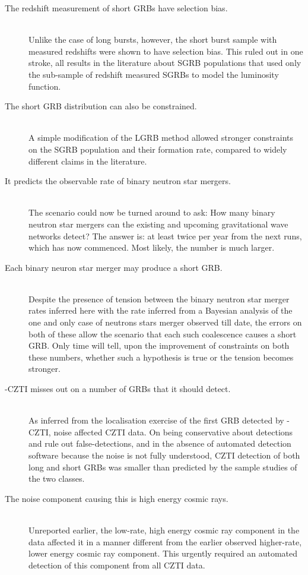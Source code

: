 \begin{description}
\item[The redshift measurement of short GRBs have selection bias.] \hfill \\
Unlike the case of long bursts, however, the short burst sample with measured redshifts were shown to have selection bias. This ruled out in one stroke, all results in the literature about SGRB populations that used only the sub-sample of redshift measured SGRBs to model the luminosity function.

\item[The short GRB distribution can also be constrained.] \hfill \\
A simple modification of the LGRB method allowed stronger constraints on the SGRB population and their formation rate, compared to widely different claims in the literature.

\item[It predicts the observable rate of binary neutron star mergers.] \hfill \\
The scenario could now be turned around to ask: How many binary neutron star mergers can the existing and upcoming gravitational wave networks detect? The answer is: at least twice per year from the next runs, which has now commenced. Most likely, the number is much larger.

\item[Each binary neuron star merger may produce a short GRB.] \hfill \\
Despite the presence of tension between the binary neutron star merger rates inferred here with the rate inferred from a Bayesian analysis of the one and only case of neutrons stars merger observed till date, the errors on both of these allow the scenario that each such coalescence causes a short GRB. Only time will tell, upon the improvement of constraints on both these numbers, whether such a hypothesis is true or the tension becomes stronger.

\item[\AS-CZTI misses out on a number of GRBs that it should detect.] \hfill \\
As inferred from the localisation exercise of the first GRB detected by \AS -CZTI, noise affected CZTI data. On being conservative about detections and rule out false-detections, and in the absence of automated detection software because the noise is not fully understood, CZTI detection of both long and short GRBs was smaller than predicted by the sample studies of the two classes.

\item[The noise component causing this is high energy cosmic rays.] \hfill \\
Unreported earlier, the low-rate, high energy cosmic ray component in the data affected it in a manner different from the earlier observed higher-rate, lower energy cosmic ray component. This urgently required an automated detection of this component from all CZTI data.


\end{description}
